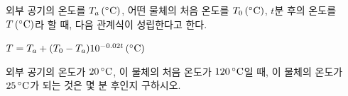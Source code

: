외부 공기의 온도를 $T_a\mkern3mu (^\circ\mathrm{C})$, 어떤 물체의 처음 온도를 $T_0\mkern3mu (^\circ\mathrm{C})$, $t$분 후의 온도를 $T\mkern3mu (^\circ\mathrm{C})$라 할 때, 다음 관계식이 성립한다고 한다. \par\smallskip\noindent\hspace*{1.5em}$T=T_a+(T_0-T_a)10^{-0.02t}\mkern3mu (^\circ\mathrm{C})$\par\smallskip\noindent 외부 공기의 온도가 $20\mkern3mu ^\circ\mathrm{C}$, 이 물체의 처음 온도가 $120\mkern3mu ^\circ\mathrm{C}$일 때, 이 물체의 온도가 $25\mkern3mu ^\circ\mathrm{C}$가 되는 것은 몇 분 후인지 구하시오. 
